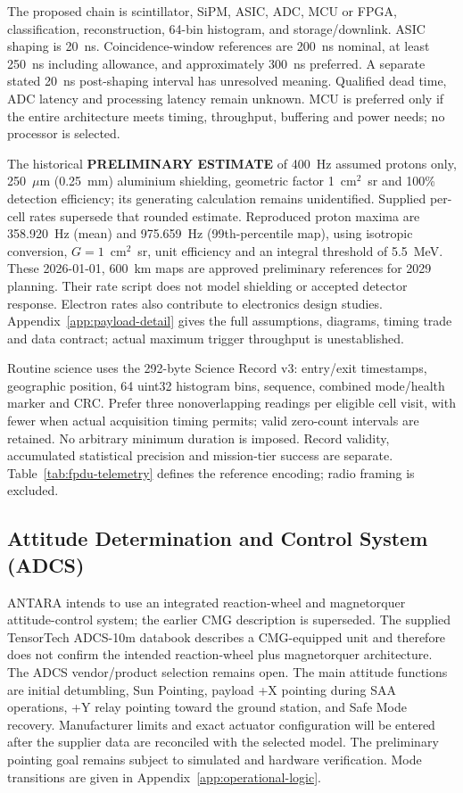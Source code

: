 The proposed chain is scintillator, SiPM, ASIC, ADC, MCU or FPGA, classification, reconstruction, 64-bin histogram, and storage/downlink. ASIC shaping is 20~ns. Coincidence-window references are 200~ns nominal, at least 250~ns including allowance, and approximately 300~ns preferred. A separate stated 20~ns post-shaping interval has unresolved meaning. Qualified dead time, ADC latency and processing latency remain unknown. MCU is preferred only if the entire architecture meets timing, throughput, buffering and power needs; no processor is selected.

The historical \textbf{PRELIMINARY ESTIMATE} of 400~Hz assumed protons only, 250~$\mu$m (0.25~mm) aluminium shielding, geometric factor 1~cm$^2$~sr and 100\% detection efficiency; its generating calculation remains unidentified. Supplied per-cell rates supersede that rounded estimate. Reproduced proton maxima are 358.920~Hz (mean) and 975.659~Hz (99th-percentile map), using isotropic conversion, $G=1$~cm$^2$~sr, unit efficiency and an integral threshold of 5.5~MeV. These 2026-01-01, 600~km maps are approved preliminary references for 2029 planning. Their rate script does not model shielding or accepted detector response. Electron rates also contribute to electronics design studies. Appendix~\ref{app:payload-detail} gives the full assumptions, diagrams, timing trade and data contract; actual maximum trigger throughput is unestablished.

Routine science uses the 292-byte Science Record v3: entry/exit timestamps, geographic position, 64 uint32 histogram bins, sequence, combined mode/health marker and CRC. Prefer three nonoverlapping readings per eligible cell visit, with fewer when actual acquisition timing permits; valid zero-count intervals are retained. No arbitrary minimum duration is imposed. Record validity, accumulated statistical precision and mission-tier success are separate. Table~\ref{tab:fpdu-telemetry} defines the reference encoding; radio framing is excluded.



\subsection{Attitude Determination and Control System (ADCS)}\label{attitude-determination-and-control-system-adcs}
ANTARA intends to use an integrated reaction-wheel and magnetorquer attitude-control system; the earlier CMG description is superseded. The supplied TensorTech ADCS-10m databook describes a CMG-equipped unit and therefore does not confirm the intended reaction-wheel plus magnetorquer architecture. The ADCS vendor/product selection remains open. The main attitude functions are initial detumbling, Sun Pointing, payload +X pointing during SAA operations, +Y relay pointing toward the ground station, and Safe Mode recovery. Manufacturer limits and exact actuator configuration will be entered after the supplier data are reconciled with the selected model. The preliminary pointing goal remains subject to simulated and hardware verification. Mode transitions are given in Appendix~\ref{app:operational-logic}.

